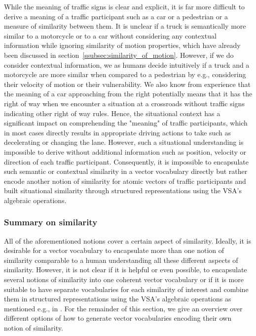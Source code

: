 While the meaning of traffic signs is clear and explicit, it is far more difficult to derive a meaning of a traffic participant such as a car or a pedestrian or a measure of similarity between them.
It is unclear if a truck is semantically more similar to a motorcycle or to a car without considering any contextual information while ignoring similarity of motion properties, which have already been discussed in section~\ref{ssubsec:similarity_of_motion}.
However, if we do consider contextual information, we as humans decide intuitively if a truck and a motorcycle are more similar when compared to a pedestrian by e.g., considering their velocity of motion or their vulnerability.
We also know from experience that the meaning of a car approaching from the right potentially means that it has the right of way when we encounter a situation at a crossroads without traffic signs indicating other right of way rules. 
Hence, the situational context has a significant impact on comprehending the "meaning" of traffic participants, which in most cases directly results in appropriate driving actions to take such as decelerating or changing the lane.
However, such a situational understanding is impossible to derive without additional information such as position, velocity or direction of each traffic participant.
Consequently, it is impossible to encapsulate such semantic or contextual similarity in a vector vocabulary directly but rather encode another notion of similarity for atomic vectors of traffic participants and built situational similarity through structured representations using the \ac{VSA}'s algebraic operations.

\subsubsection{Summary on similarity}%
\label{ssubsec:summary_similarity}

All of the aforementioned notions cover a certain aspect of similarity.
Ideally, it is desirable for a vector vocabulary to encapsulate more than one notion of similarity comparable to a human understanding all these different aspects of similarity.
However, it is not clear if it is helpful or even possible, to encapsulate several notions of similarity into one coherent vector vocabulary or if it is more suitable to have separate vocabularies for each similarity of interest and combine them in structured representations using the \ac{VSA}'s algebraic operations as mentioned e.g., in \cite{Crawford2016}.
For the remainder of this section, we give an overview over different options of how to generate vector vocabularies encoding their own notion of similarity.

